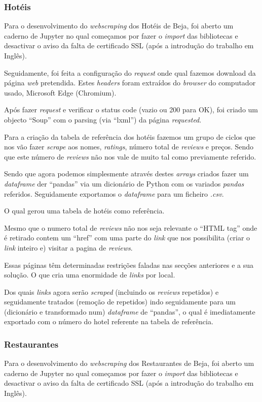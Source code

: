 \subsubsection{Hotéis}

Para o desenvolvimento do \textit{webscraping} dos Hotéis de Beja, foi aberto um caderno de Jupyter no qual começamos por fazer o \textit{import} das bibliotecas e desactivar o aviso da falta de certificado SSL (após a introdução do trabalho em Inglês).

Seguidamente, foi feita a configuração do \textit{request} onde qual fazemos download da página \textit{web} pretendida. Estes \textit{headers} foram extraídos do \textit{browser} do computador usado, Microsoft Edge (Chromium).

Após fazer \textit{request} e verificar o status code (vazio ou 200 para OK), foi criado um objecto ``Soup'' com o parsing (via ``lxml'') da página \textit{requested}.

Para a criação da tabela de referência dos hotéis fazemos um grupo de ciclos que nos vão fazer \textit{scrape} aos nomes, \textit{ratings}, número total de \textit{reviews} e preços. Sendo que este número de \textit{reviews} não nos vale de muito tal como previamente referido.

Sendo que agora podemos simplesmente através destes \textit{arrays} criados fazer um \textit{dataframe} der ``pandas'' via um dicionário de Python com os variados \textit{pandas} referidos. Seguidamente exportamos o \textit{dataframe} para um ficheiro \textit{.csv}.

O qual gerou uma tabela de hotéis como referência.

Mesmo que o numero total de \textit{reviews} não nos seja relevante o ``HTML tag'' onde é retirado contem um ``href'' com uma parte do \textit{link} que nos possibilita (criar o \textit{link} inteiro e) visitar a pagina de \textit{reviews}.

Essas páginas têm determinadas restrições faladas nas secções anteriores e a sua solução. O que cria uma enormidade de \textit{links} por local.

Dos quais \textit{links} agora serão \textit{scraped} (incluindo os \textit{reviews} repetidos) e seguidamente tratados (remoção de repetidos) indo seguidamente para um (dicionário e transformado num) \textit{dataframe} de ``pandas'', o qual é imediatamente exportado com o número do hotel referente na tabela de referência.

\subsubsection{Restaurantes}
Para o desenvolvimento do \textit{webscraping} dos Restaurantes de Beja, foi aberto um caderno de Jupyter no qual começamos por fazer o \textit{import} das bibliotecas e desactivar o aviso da falta de certificado SSL (após a introdução do trabalho em Inglês).

